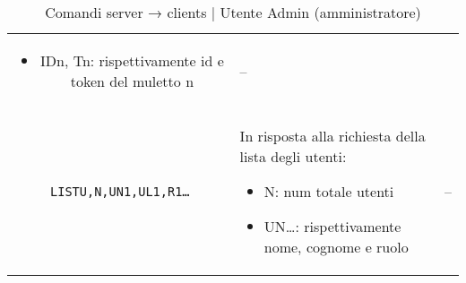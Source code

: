 \begin{table}[h!]
\begin{tabular}{|c|p{8cm}|c|}
\begin{itemize}
                \item IDn, Tn: rispettivamente id e token del muletto n
            \end{itemize}
            & -- \\

            \texttt{LISTU,N,UN1,UL1,R1…} & In risposta alla richiesta della lista degli utenti:
            \begin{itemize}
                \item N: num totale utenti

                \item UN…: rispettivamente nome, cognome e ruolo
            \end{itemize}
            & -- \\


            \hline
        \end{tabular}
        \caption{Comandi server → clients | Utente Admin (amministratore)}
    \end{table}


\begin{comment}
\begin{longtable}[h!]{|p{2cm}|p{8cm}|p{2cm}|}
\hline
\rowcolorhead
\multicolumn{3}{|c|}{\headertitle{FORKLIFTS}}\\
\hline
\rowcolorhead
\headertitle{Comando} & \headertitle{Descrizione} & \headertitle{Risposta} \\
\hline
POS,X,Y,DIR & posizione attuale del muletto, considerando la mappa come una matrice:\newline
\begin{itemize}
\item     X: riga della matrice
\item     Y: colonna ““
\item     DIR: orientamento assoluto secondo enum Orientation
\end{itemize}

& -- \\
LIST & richiede nuova lista di task\textsubscript{G} da completare & LIST... \\




\caption{prova}
\end{longtable}
\end{comment}














